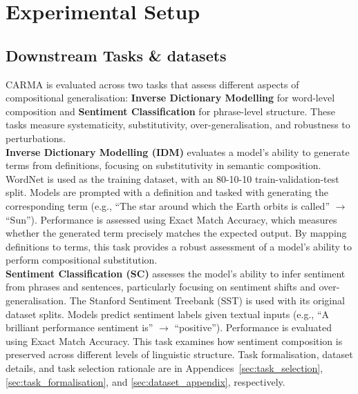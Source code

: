 \section{Experimental Setup}\label{sec:experiments}
\subsection{Downstream Tasks \& datasets}
CARMA is evaluated across two tasks that assess different aspects of compositional generalisation: \textbf{Inverse Dictionary Modelling} for word-level composition and \textbf{Sentiment Classification} for phrase-level structure. These tasks measure systematicity, substitutivity, over-generalisation, and robustness to perturbations.\\
\noindent\textbf{Inverse Dictionary Modelling (IDM)} evaluates a model's ability to generate terms from definitions, focusing on substitutivity in semantic composition. WordNet \cite{miller-1994-wordnet} is used as the training dataset, with an 80-10-10 train-validation-test split. Models are prompted with a definition and tasked with generating the corresponding term (e.g., ``The star around which the Earth orbits is called'' $\rightarrow$ ``Sun''). Performance is assessed using Exact Match Accuracy, which measures whether the generated term precisely matches the expected output. By mapping definitions to terms, this task provides a robust assessment of a model's ability to perform compositional substitution.\\
\noindent\textbf{Sentiment Classification (SC)} assesses the model's ability to infer sentiment from phrases and sentences, particularly focusing on sentiment shifts and over-generalisation. The Stanford Sentiment Treebank (SST) \cite{socher2013recursive} is used with its original dataset splits. Models predict sentiment labels given textual inputs (e.g., ``A brilliant performance sentiment is'' $\rightarrow$ ``positive''). Performance is evaluated using Exact Match Accuracy. This task examines how sentiment composition is preserved across different levels of linguistic structure.
Task formalisation, dataset details, and task selection rationale are in Appendices~\ref{sec:task_selection}, \ref{sec:task_formalisation}, and \ref{sec:dataset_appendix}, respectively.

